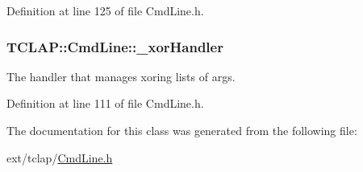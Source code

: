 Definition at line 125 of file Cmd\+Line.\+h.

\hypertarget{class_t_c_l_a_p_1_1_cmd_line_a33846aa10c62ecd61640c93c16ac315d}{}
\subsubsection[{\+\_\+xor\+Handler}]{ T\+C\+L\+A\+P\+::\+Cmd\+Line\+::\+\_\+xor\+Handler\hspace{0.3cm}{\ttfamily [protected]}}\label{class_t_c_l_a_p_1_1_cmd_line_a33846aa10c62ecd61640c93c16ac315d}
The handler that manages xoring lists of args. 

Definition at line 111 of file Cmd\+Line.\+h.



The documentation for this class was generated from the following file\+:\begin{DoxyCompactItemize}
\item 
ext/tclap/\hyperlink{_cmd_line_8h}{Cmd\+Line.\+h}\end{DoxyCompactItemize}
